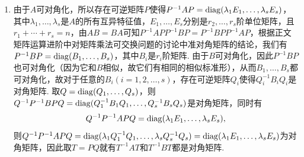 \begin{exercise}
\begin{exgroup}
\begin{answer}
\begin{enumerate}
\begin{enumerate}
                          \item 充分性：必要性：$A$有$n$个互不相等的特征值，则$A$一定可对角化，则$A$有$n$个线性无关特征向量$X_1,\ldots,X_n$，由于它们也是$B$的特征向量，故$B$可对角化. 设$P=(X_1,\ldots,X_n)$，则$P^{-1}AP=\varLambda_1$，$P^{-1}BP=\varLambda_2$，其中$\varLambda_1$和$\varLambda_2$都是对角矩阵，则它们乘法可交换，即$(P^{-1}AP)(P^{-1}BP)=\varLambda_1\varLambda_2=\varLambda_2\varLambda_1=(P^{-1}BP)(P^{-1}AP)$，上式两边左乘$P$，右乘$P^{-1}$，则$AB=BA$.
                      \end{enumerate}

                \item 由于$A$可对角化，所以存在可逆矩阵$P$使得$P^{-1}AP=\operatorname{diag}(\lambda_1E_1,\ldots,\lambda_sE_s)$，其中$\lambda_1,\ldots,\lambda_s$是$A$的所有互异特征值，$E_1,\ldots,E_s$分别是$r_2,\ldots,r_s$阶单位矩阵，且$r_1+\cdots+r_s=n$，由$AB=BA$可知$P^{-1}APP^{-1}BP=P^{-1}BPP^{-1}AP$，根据正文矩阵运算进阶中对矩阵乘法可交换问题的讨论中准对角矩阵的结论，我们有$P^{-1}BP=\operatorname{diag}(B_1,\ldots,B_s)$，其中$B_i$是$r_i$阶矩阵. 由于$B$可对角化，因此$P^{-1}BP$也可对角化（因为它和$B$相似，故它们有相同的相似标准形），从而$B_1,\ldots,B_s$都可对角化，故对于任意的$B_i(i=1,2,\ldots,s)$，存在可逆矩阵$Q_i$使得$Q_i^{-1}B_iQ_i$是对角矩阵. 取$Q=\operatorname{diag}(Q_1,\ldots,Q_s)$，则$Q^{-1}P^{-1}BPQ=\operatorname{diag}(Q_1^{-1}B_1Q_1,\ldots,Q_s^{-1}B_sQ_s)$是对角矩阵，同时有
                      \[Q^{-1}P^{-1}APQ=\operatorname{diag}(\lambda_1E_1,\ldots,\lambda_sE_s),\]
                      则$Q^{-1}P^{-1}APQ=\operatorname{diag}(\lambda_1Q_1^{-1}Q_1,\ldots,\lambda_sQ_s^{-1}Q_s)=\operatorname{diag}(\lambda_1E_1,\ldots,\lambda_sE_s)$为对角矩阵，因此取$T=PQ$就有$T^{-1}AT$和$T^{-1}BT$都是对角矩阵.
            \end{enumerate}
        \end{answer}


\end{exgroup}
\end{exercise}
